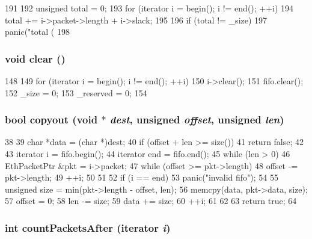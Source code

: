 \begin{DoxyCode}
191     {
192         unsigned total = 0;
193         for (iterator i = begin(); i != end(); ++i)
194             total += i->packet->length + i->slack;
195 
196         if (total != _size)
197             panic("total (%
198     }
\end{DoxyCode}
\hypertarget{classPacketFifo_ac8bb3912a3ce86b15842e79d0b421204}{
\subsubsection[{clear}]{\setlength{\rightskip}{0pt plus 5cm}void clear ()}}
\label{classPacketFifo_ac8bb3912a3ce86b15842e79d0b421204}



\begin{DoxyCode}
148     {
149         for (iterator i = begin(); i != end(); ++i)
150             i->clear();
151         fifo.clear();
152         _size = 0;
153         _reserved = 0;
154     }
\end{DoxyCode}
\hypertarget{classPacketFifo_a7848b43d10dbb281fedc589ae961c63f}{
\subsubsection[{copyout}]{\setlength{\rightskip}{0pt plus 5cm}bool copyout (void $\ast$ {\em dest}, \/  unsigned {\em offset}, \/  unsigned {\em len})}}
\label{classPacketFifo_a7848b43d10dbb281fedc589ae961c63f}



\begin{DoxyCode}
38 {
39     char *data = (char *)dest;
40     if (offset + len >= size())
41         return false;
42 
43     iterator i = fifo.begin();
44     iterator end = fifo.end();
45     while (len > 0) {
46         EthPacketPtr &pkt = i->packet;
47         while (offset >= pkt->length) {
48             offset -= pkt->length;
49             ++i;
50         }
51 
52         if (i == end)
53             panic("invalid fifo");
54 
55         unsigned size = min(pkt->length - offset, len);
56         memcpy(data, pkt->data, size);
57         offset = 0;
58         len -= size;
59         data += size;
60         ++i;
61     }
62 
63     return true;
64 }
\end{DoxyCode}
\hypertarget{classPacketFifo_af8cc52fa26b81200af7971e0f495ee00}{
\subsubsection[{countPacketsAfter}]{\setlength{\rightskip}{0pt plus 5cm}int countPacketsAfter ({\bf iterator} {\em i})}}
\label{classPacketFifo_af8cc52fa26b81200af7971e0f495ee00}



